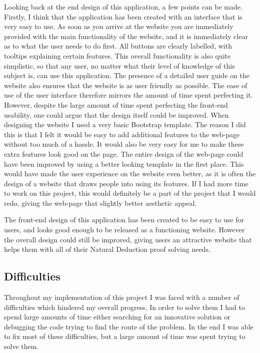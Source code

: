 Looking back at the end design of this application, a few points can be made. Firstly, I think that the application has been created with an interface that is very easy to use. As soon as you arrive at the website you are immediately provided with the main functionality of the website, and it is immediately clear as to what the user needs to do first. All buttons are clearly labelled, with tooltips explaining certain features. This overall functionality is also quite simplistic, so that any user, no matter what their level of knowledge of this subject is, can use this application. The presence of a detailed user guide on the website also ensures that the website is as user friendly as possible. The ease of use of the user interface therefore mirrors the amount of time spent perfecting it. However, despite the large amount of time spent perfecting the front-end usability, one could argue that the design itself could be improved. When designing the website I used a very basic Bootstrap template. The reason I did this is that I felt it would be easy to add additional features to the web-page without too much of a hassle. It would also be very easy for me to make these extra features look good on the page. The entire design of the web-page could have been improved by using a better looking template in the first place. This would have made the user experience on the website even better, as it is often the design of a website that draws people into using its features. If I had more time to work on this project, this would definitely be a part of the project that I would redo, giving the web-page that slightly better aesthetic appeal.

The front-end design of this application has been created to be easy to use for users, and looks good enough to be released as a functioning website. However the overall design could still be improved, giving users an attractive website that helps them with all of their Natural Deduction proof solving needs.

\subsection{Difficulties}

Throughout my implementation of this project I was faced with a number of difficulties which hindered my overall progress. In order to solve them I had to spend large amounts of time either searching for an innovative solution or debugging the code trying to find the route of the problem. In the end I was able to fix most of these difficulties, but a large amount of time was spent trying to solve them.

